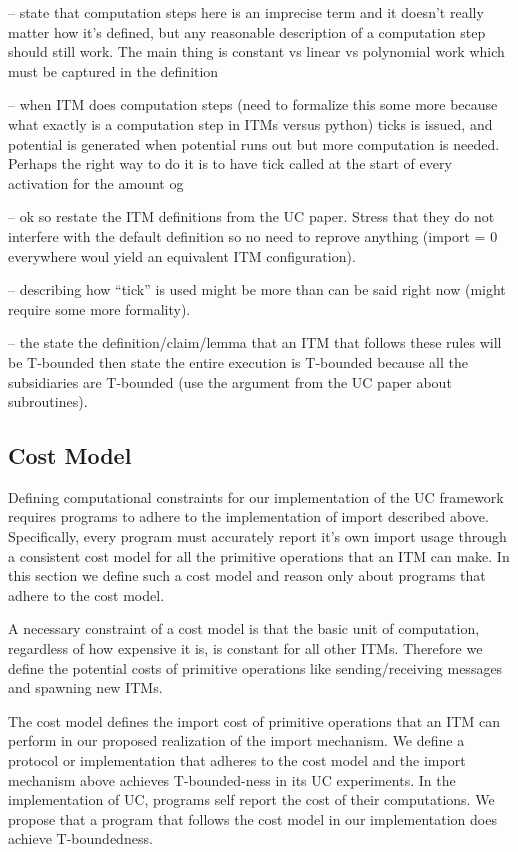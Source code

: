 -- state that computation steps here is an imprecise term and it doesn't really matter how it's defined, but any reasonable description of a computation step should still work. The main thing is constant vs linear vs polynomial work which must be captured in the definition

-- when ITM does computation steps (need to formalize this some more because what exactly is a computation step in ITMs versus python) ticks is issued, and potential is generated when potential runs out but more computation is needed. Perhaps the right way to do it is to have tick called at the start of every activation for the amount og 

-- ok so restate the ITM definitions from the UC paper. Stress that they do not interfere with the default definition so no need to reprove anything (import = 0 everywhere woul yield an equivalent ITM configuration).

-- describing how ``tick'' is used might be more than can be said right now (might require some more formality).

-- the state the definition/claim/lemma that an ITM that follows these rules will be T-bounded then state the entire execution is T-bounded because all the subsidiaries are T-bounded (use the argument from the UC paper about subroutines).


\subsection{Cost Model}
Defining computational constraints for our implementation of the UC framework requires programs to adhere to the implementation of import described above. 
Specifically, every program must accurately report it's own import usage through a consistent cost model for all the primitive operations that an ITM can make.
In this section we define such a cost model and reason only about programs that adhere to the cost model.

A necessary constraint of a cost model is that the basic unit of computation, regardless of how expensive it is, is constant for all other ITMs.
Therefore we define the potential costs of primitive operations like sending/receiving messages and spawning new ITMs.

The cost model defines the import cost of primitive operations that an ITM can perform in our proposed realization of the import mechanism.
We define a protocol or implementation that adheres to the cost model and the import mechanism above achieves T-bounded-ness in its UC experiments.
In the implementation of UC, programs self report the cost of their computations. 
We propose that a program that follows the cost model in our implementation does achieve T-boundedness.

